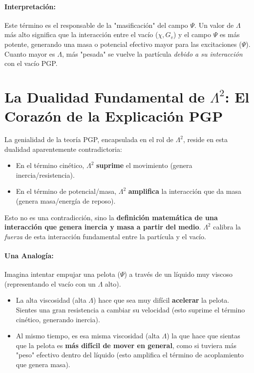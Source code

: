 \documentclass{article}
\newcommand{\LambdaSq}{\Lambda^2}
\newcommand{\Chi}{\chi}
\newcommand{\Gv}{G_v}
\begin{document}
\paragraph{Interpretación:}
Este término es el responsable de la "masificación" del campo $\Psi$. Un valor de $\Lambda$ más alto significa que la interacción entre el vacío ($\Chi, \Gv$) y el campo $\Psi$ es más potente, generando una masa o potencial efectivo mayor para las excitaciones ($\Psi$). Cuanto mayor es $\Lambda$, más "pesada" se vuelve la partícula \emph{debido a su interacción} con el vacío PGP.

\section{La Dualidad Fundamental de $\Lambda^2$: El Corazón de la Explicación PGP}

La genialidad de la teoría PGP, encapsulada en el rol de $\LambdaSq$, reside en esta dualidad aparentemente contradictoria:

\begin{itemize}
    \item En el término cinético, $\LambdaSq$ \textbf{suprime} el movimiento (genera inercia/resistencia).
    \item En el término de potencial/masa, $\LambdaSq$ \textbf{amplifica} la interacción que da masa (genera masa/energía de reposo).
\end{itemize}

Esto no es una contradicción, sino la \textbf{definición matemática de una interacción que genera inercia y masa a partir del medio}. $\LambdaSq$ calibra la \emph{fuerza} de esta interacción fundamental entre la partícula y el vacío.

\paragraph{Una Analogía:}
Imagina intentar empujar una pelota ($\Psi$) a través de un líquido muy viscoso (representando el vacío con un $\Lambda$ alto).

\begin{itemize}
    \item La alta viscosidad (alta $\Lambda$) hace que sea muy difícil \textbf{acelerar} la pelota. Sientes una gran resistencia a cambiar su velocidad (esto suprime el término cinético, generando inercia).
    \item Al mismo tiempo, es esa misma viscosidad (alta $\Lambda$) la que hace que sientas que la pelota es \textbf{más difícil de mover en general}, como si tuviera más "peso" efectivo dentro del líquido (esto amplifica el término de acoplamiento que genera masa).
\end{itemize}
\end{document}

